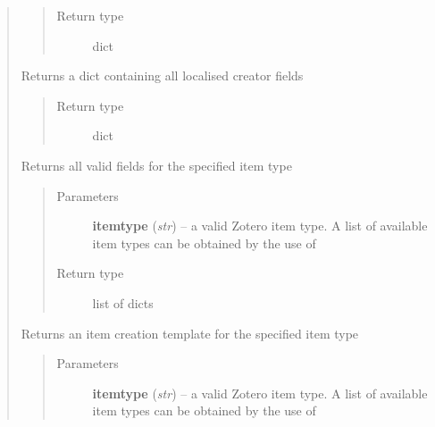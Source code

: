 \documentclass[letterpaper,10pt,english]{sphinxmanual}
\begin{document}
\begin{quote}
\begin{fulllineitems}
\begin{quote}
\begin{description}
\item[{Return type}] \leavevmode
dict

\end{description}\end{quote}

\end{fulllineitems}


\begin{fulllineitems}
\label{index:pyzotero.zotero.Zotero.creator_fields}
Returns a dict containing all localised creator fields
\begin{quote}\begin{description}
\item[{Return type}] \leavevmode
dict

\end{description}\end{quote}

\end{fulllineitems}


\begin{fulllineitems}
\label{index:pyzotero.zotero.Zotero.item_type_fields}
Returns all valid fields for the specified item type
\begin{quote}\begin{description}
\item[{Parameters}] \leavevmode
\textbf{itemtype} (\emph{str}) -- a valid Zotero item type. A list of available item types can be obtained by the use of {\hyperref[index:pyzotero.zotero.Zotero.item_types]{}}

\item[{Return type}] \leavevmode
list of dicts

\end{description}\end{quote}

\end{fulllineitems}


\begin{fulllineitems}
\label{index:pyzotero.zotero.Zotero.item_template}
Returns an item creation template for the specified item type
\begin{quote}\begin{description}
\item[{Parameters}] \leavevmode
\textbf{itemtype} (\emph{str}) -- a valid Zotero item type. A list of available item types can be obtained by the use of {\hyperref[index:pyzotero.zotero.Zotero.item_types]{}}


\end{description}
\end{quote}
\end{fulllineitems}
\end{quote}
\end{document}
